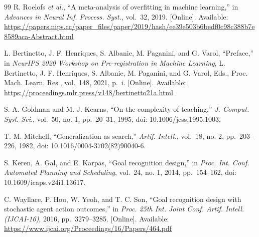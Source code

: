 \documentclass[journal]{IEEEtran}
\begin{document}
\begin{thebibliography}{99}
R. Roelofs \emph{et al.}, ``A meta-analysis of overfitting in machine
learning,'' in \emph{Advances in Neural Inf. Process. Syst.}, vol.~32,
2019. {[}Online{]}. Available:
\url{https://papers.nips.cc/paper_files/paper/2019/hash/ee39e503b6bedf0c98c388b7e8589aca-Abstract.html}

L. Bertinetto, J. F. Henriques, S. Albanie, M. Paganini, and G. Varol,
``Preface,'' in \emph{NeurIPS 2020 Workshop on Pre-registration in
Machine Learning}, L. Bertinetto, J. F. Henriques, S. Albanie, M.
Paganini, and G. Varol, Eds., Proc. Mach. Learn. Res., vol.~148, 2021,
p.~i. {[}Online{]}. Available:
\url{https://proceedings.mlr.press/v148/bertinetto21a.html}

S. A. Goldman and M. J. Kearns, ``On the complexity of teaching,''
\emph{J. Comput. Syst. Sci.}, vol.~50, no. 1, pp.~20--31, 1995, doi:
10.1006/jcss.1995.1003.

T. M. Mitchell, ``Generalization as search,'' \emph{Artif. Intell.},
vol.~18, no. 2, pp.~203--226, 1982, doi: 10.1016/0004-3702(82)90040-6.

S. Keren, A. Gal, and E. Karpas, ``Goal recognition design,'' in
\emph{Proc. Int. Conf. Automated Planning and Scheduling}, vol.~24, no.
1, 2014, pp.~154--162, doi: 10.1609/icaps.v24i1.13617.

C. Wayllace, P. Hou, W. Yeoh, and T. C. Son, ``Goal recognition design
with stochastic agent action outcomes,'' in \emph{Proc. 25th Int. Joint
Conf. Artif. Intell. (IJCAI-16)}, 2016, pp.~3279--3285. {[}Online{]}.
Available: \url{https://www.ijcai.org/Proceedings/16/Papers/464.pdf}
\end{thebibliography}
\end{document}
